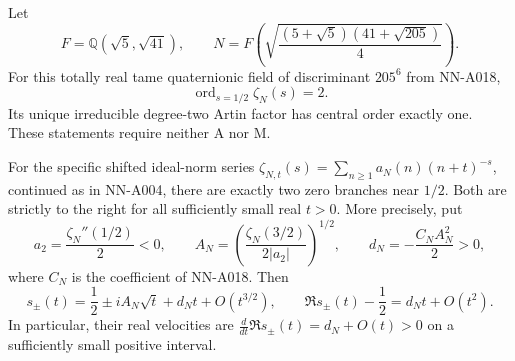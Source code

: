 \begin{corollary}
\label{cor:analytic-martinet-exact-two}
Let
\[
 F=\mathbb Q(\sqrt5,\sqrt{41}),\qquad
 N=F\left(\sqrt{\frac{(5+\sqrt5)(41+\sqrt{205})}{4}}\right).
\]
For this totally real tame quaternionic field of discriminant
$205^6$ from NN-A018,
\[
               \operatorname{ord}_{s=1/2}\zeta_N(s)=2.
\]
Its unique irreducible degree-two Artin factor has central order
exactly one. These statements require neither A nor M.

For the specific shifted ideal-norm series
$\zeta_{N,t}(s)=\sum_{n\ge1}a_N(n)(n+t)^{-s}$, continued as in
NN-A004, there are exactly two zero branches near $1/2$. Both
are strictly to the right for all sufficiently small real
$t>0$. More precisely, put
\[
 a_2=\frac{\zeta_N''(1/2)}2<0,\qquad
 A_N=\left(\frac{\zeta_N(3/2)}{2|a_2|}\right)^{1/2},\qquad
 d_N=-\frac{C_N A_N^2}{2}>0,
\]
where $C_N$ is the coefficient of NN-A018. Then
\begin{equation}\label{eq:analytic-martinet-two-right}
 s_\pm(t)=\frac12\pm i A_N\sqrt t+d_Nt+O(t^{3/2}),
 \qquad
 \Re s_\pm(t)-\frac12=d_Nt+O(t^2).
\end{equation}
In particular, their real velocities are
$\frac{d}{dt}\Re s_\pm(t)=d_N+O(t)>0$ on a sufficiently small
positive interval.
\end{corollary}

